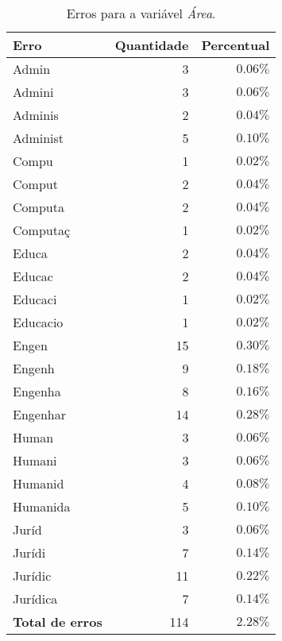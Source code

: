 \documentclass[10pt,a4paper,oneside]{article}
\begin{document}
\begin{table}[!h]
\centering
\caption{Erros para a variável \textit{Área}.}
\vspace{0.5em}
\label{table: erros-area}
\begin{tabular}{l r r}
	\toprule
	\textbf{Erro} & \textbf{Quantidade}  & \textbf{Percentual} \\
	\midrule

	Admin      & 3   & $0.06\%$ \\
	Admini 	   & 3   & $0.06\%$ \\
	Adminis    & 2   & $0.04\%$ \\
	Administ   & 5   & $0.10\%$ \\
	Compu      & 1   & $0.02\%$ \\
	Comput     & 2   & $0.04\%$ \\
	Computa    & 2   & $0.04\%$ \\
	Computaç   & 1   & $0.02\%$ \\
	Educa      & 2   & $0.04\%$ \\
	Educac     & 2   & $0.04\%$ \\
	Educaci    & 1   & $0.02\%$ \\
	Educacio   & 1   & $0.02\%$ \\
	Engen      & 15  & $0.30\%$ \\
	Engenh     & 9   & $0.18\%$ \\
	Engenha    & 8   & $0.16\%$ \\
	Engenhar   & 14  & $0.28\%$ \\
	Human      & 3   & $0.06\%$ \\
	Humani     & 3   & $0.06\%$ \\
	Humanid    & 4   & $0.08\%$ \\
	Humanida   & 5   & $0.10\%$ \\
	Juríd      & 3   & $0.06\%$ \\
	Jurídi     & 7   & $0.14\%$ \\
	Jurídic    & 11  & $0.22\%$ \\
	Jurídica   & 7   & $0.14\%$ \\	
	\midrule
	\textbf{Total de erros}  & 114  & $2.28\%$ \\	
	\bottomrule
\end{tabular}
\end{table}


\pagebreak
\end{document}
